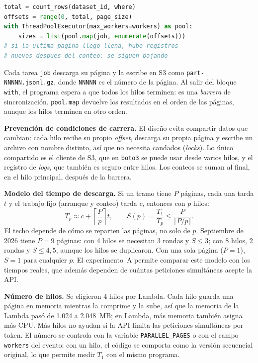 \documentclass[conference]{IEEEtran}
\begin{document}
\begin{lstlisting}[language=Python]
total = count_rows(dataset_id, where)
offsets = range(0, total, page_size)
with ThreadPoolExecutor(max_workers=workers) as pool:
    sizes = list(pool.map(job, enumerate(offsets)))
# si la ultima pagina llego llena, hubo registros
# nuevos despues del conteo: se siguen bajando
\end{lstlisting}

Cada tarea \texttt{job} descarga su página y la escribe en S3 como \texttt{part-NNNNN.jsonl.gz}, donde \texttt{NNNNN} es el número de la página. Al salir del bloque \texttt{with}, el programa espera a que todos los hilos terminen: es una \emph{barrera} de sincronización. \texttt{pool.map} devuelve los resultados en el orden de las páginas, aunque los hilos terminen en otro orden.

\textbf{Prevención de condiciones de carrera.} El diseño evita compartir datos que cambian: cada hilo recibe su propio \textit{offset}, descarga su propia página y escribe un archivo con nombre distinto, así que no necesita candados (\textit{locks}). Lo único compartido es el cliente de S3, que en \texttt{boto3} se puede usar desde varios hilos, y el registro de \textit{logs}, que también es seguro entre hilos. Los conteos se suman al final, en el hilo principal, después de la barrera.

\textbf{Modelo del tiempo de descarga.} Si un tramo tiene $P$ páginas, cada una tarda $t$ y el trabajo fijo (arranque y conteo) tarda $c$, entonces con $p$ hilos:
\begin{equation}
T_p \approx c + \left\lceil \frac{P}{p} \right\rceil t, \qquad S(p) = \frac{T_1}{T_p} \leq \frac{P}{\lceil P/p \rceil}.
\end{equation}
El techo depende de cómo se reparten las páginas, no solo de $p$. Septiembre de 2026 tiene $P = 9$ páginas: con 4 hilos se necesitan 3 rondas y $S \leq 3$; con 8 hilos, 2 rondas y $S \leq 4{,}5$, aunque los hilos se duplicaron. Con una sola página ($P = 1$), $S = 1$ para cualquier $p$. El experimento~A permite comparar este modelo con los tiempos reales, que además dependen de cuántas peticiones simultáneas acepte la API.

\textbf{Número de hilos.} Se eligieron 4 hilos por Lambda. Cada hilo guarda una página en memoria mientras la comprime y la sube, así que la memoria de la Lambda pasó de 1.024 a 2.048~MB; en Lambda, más memoria también asigna más CPU. Más hilos no ayudan si la API limita las peticiones simultáneas por token. El número se controla con la variable \texttt{PARALLEL\_PAGES} o con el campo \texttt{workers} del evento; con un hilo, el código se comporta como la versión secuencial original, lo que permite medir $T_1$ con el mismo programa.
\end{document}
